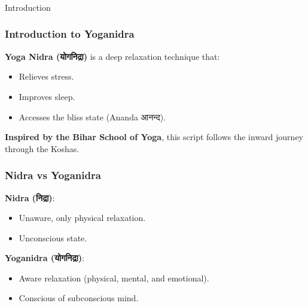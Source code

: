 \begin{frame}[fragile]\frametitle{}
\begin{center}
{\Large Introduction}
\end{center}
\end{frame}


\begin{frame}[fragile]\frametitle{Introduction to Yoganidra}
    \textbf{Yoga Nidra (योगनिद्रा)} is a deep relaxation technique that:
    \begin{itemize}
        \item Relieves stress.
        \item Improves sleep.
        \item Accesses the bliss state (Ananda आनन्द).
    \end{itemize}
    \textbf{Inspired by the Bihar School of Yoga}, this script follows the inward journey through the Koshas.
\end{frame}

\begin{frame}[fragile]\frametitle{Nidra vs Yoganidra}
    \textbf{Nidra (निद्रा)}: \\
    \begin{itemize}
        \item Unaware, only physical relaxation.
        \item Unconscious state.
    \end{itemize}
    \vspace{5mm}
    \textbf{Yoganidra (योगनिद्रा)}: \\
    \begin{itemize}
        \item Aware relaxation (physical, mental, and emotional).
        \item Conscious of subconscious mind.
    \end{itemize}
\end{frame}

